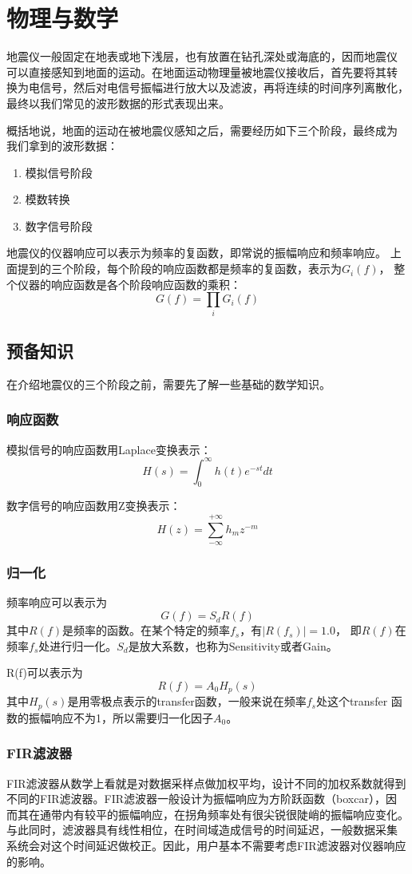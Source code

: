 \section{物理与数学}
地震仪一般固定在地表或地下浅层，也有放置在钻孔深处或海底的，因而地震仪
可以直接感知到地面的运动。在地面运动物理量被地震仪接收后，首先要将其转
换为电信号，然后对电信号振幅进行放大以及滤波，再将连续的时间序列离散化，
最终以我们常见的波形数据的形式表现出来。

概括地说，地面的运动在被地震仪感知之后，需要经历如下三个阶段，最终成为
我们拿到的波形数据：
\begin{enumerate}
\item 模拟信号阶段
\item 模数转换
\item 数字信号阶段
\end{enumerate}

地震仪的仪器响应可以表示为频率的复函数，即常说的振幅响应和频率响应。
上面提到的三个阶段，每个阶段的响应函数都是频率的复函数，表示为$G_i(f)$，
整个仪器的响应函数是各个阶段响应函数的乘积：
\[
    G(f)=\prod_i G_i(f)
\]

\subsection{预备知识}
在介绍地震仪的三个阶段之前，需要先了解一些基础的数学知识。
\subsubsection{响应函数}
模拟信号的响应函数用Laplace变换表示：
\[
    H(s)=\int_0^{\infty}h(t)e^{-st}dt
\]

数字信号的响应函数用Z变换表示：
\[
    H(z)=\sum_{-\infty}^{+\infty}h_m z^{-m}
\]

\subsubsection{归一化}
频率响应可以表示为
\[
    G(f)=S_d R(f)
\]
其中$R(f)$是频率的函数。在某个特定的频率$f_s$，有$|R(f_s)|=1.0$，
即$R(f)$在频率$f_s$处进行归一化。$S_d$是放大系数，也称为Sensitivity或者Gain。

R(f)可以表示为
\[
    R(f)= A_0 H_p(s)
\]
其中$H_p(s)$是用零极点表示的transfer函数，一般来说在频率$f_s$处这个transfer
函数的振幅响应不为1，所以需要归一化因子$A_0$。

\subsubsection{FIR滤波器}
FIR滤波器从数学上看就是对数据采样点做加权平均，设计不同的加权系数就得到
不同的FIR滤波器。FIR滤波器一般设计为振幅响应为方阶跃函数（boxcar），因
而其在通带内有较平的振幅响应，在拐角频率处有很尖锐很陡峭的振幅响应变化。
与此同时，滤波器具有线性相位，在时间域造成信号的时间延迟，一般数据采集
系统会对这个时间延迟做校正。因此，用户基本不需要考虑FIR滤波器对仪器响应的影响。

